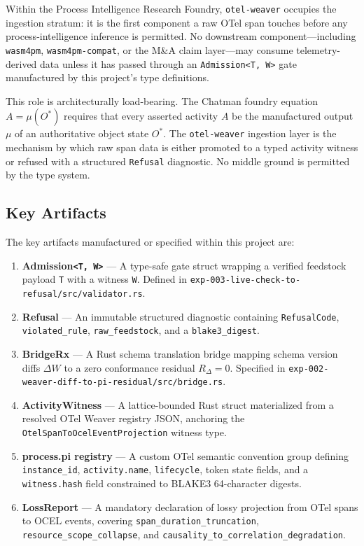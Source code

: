Within the Process Intelligence Research Foundry, \texttt{otel-weaver} occupies the ingestion
stratum: it is the first component a raw OTel span touches before any process-intelligence
inference is permitted. No downstream component---including \texttt{wasm4pm},
\texttt{wasm4pm-compat}, or the M\&A claim layer---may consume telemetry-derived data unless it
has passed through an \texttt{Admission<T,\,W>} gate manufactured by this project's type
definitions.

This role is architecturally load-bearing. The Chatman foundry equation $A = \mu(O^*)$ requires
that every asserted activity $A$ be the manufactured output $\mu$ of an authoritative object state
$O^*$. The \texttt{otel-weaver} ingestion layer is the mechanism by which raw span data is either
promoted to a typed activity witness or refused with a structured \texttt{Refusal} diagnostic. No
middle ground is permitted by the type system.

\subsection{Key Artifacts}
\label{sec:otel-weaver-identity-artifacts}

The key artifacts manufactured or specified within this project are:

\begin{enumerate}
  \item \textbf{Admission\texttt{<T,\,W>}} --- A type-safe gate struct wrapping a verified
    feedstock payload \texttt{T} with a witness \texttt{W}. Defined in
    \texttt{exp-003-live-check-to-refusal/src/validator.rs}.
  \item \textbf{Refusal} --- An immutable structured diagnostic containing \texttt{RefusalCode},
    \texttt{violated\_rule}, \texttt{raw\_feedstock}, and a \texttt{blake3\_digest}.
  \item \textbf{BridgeRx} --- A Rust schema translation bridge mapping schema version diffs
    $\Delta W$ to a zero conformance residual $R_\Delta = 0$. Specified in
    \texttt{exp-002-weaver-diff-to-pi-residual/src/bridge.rs}.
  \item \textbf{ActivityWitness} --- A lattice-bounded Rust struct materialized from a resolved
    OTel Weaver registry JSON, anchoring the \texttt{OtelSpanToOcelEventProjection} witness type.
  \item \textbf{process.pi registry} --- A custom OTel semantic convention group defining
    \texttt{instance\_id}, \texttt{activity.name}, \texttt{lifecycle}, token state fields, and
    a \texttt{witness.hash} field constrained to BLAKE3 64-character digests.
  \item \textbf{LossReport} --- A mandatory declaration of lossy projection from OTel spans to
    OCEL events, covering \texttt{span\_duration\_truncation},
    \texttt{resource\_scope\_collapse}, and \texttt{causality\_to\_correlation\_degradation}.
\end{enumerate}
